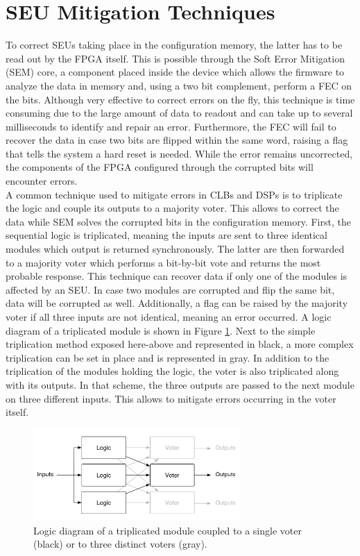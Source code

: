   \section{SEU Mitigation Techniques}

    To correct SEUs taking place in the configuration memory, the latter has to be read out by the FPGA itself. This is possible through the Soft Error Mitigation (SEM) core, a component placed inside the device which allows the firmware to analyze the data in memory and, using a two bit complement, perform a FEC on the bits. Although very effective to correct errors on the fly, this technique is time consuming due to the large amount of data to readout and can take up to several milliseconds to identify and repair an error. Furthermore, the FEC will fail to recover the data in case two bits are flipped within the same word, raising a flag that tells the system a hard reset is needed. While the error remains uncorrected, the components of the FPGA configured through the corrupted bits will encounter errors. \\

    A common technique used to mitigate errors in CLBs and DSPs is to triplicate the logic and couple its outputs to a majority voter. This allows to correct the data while SEM solves the corrupted bits in the configuration memory. First, the sequential logic is triplicated, meaning the inputs are sent to three identical modules which output is returned synchronously. The latter are then forwarded to a majority voter which performs a bit-by-bit vote and returns the most probable response. This technique can recover data if only one of the modules is affected by an SEU. In case two modules are corrupted and flip the same bit, data will be corrupted as well. Additionally, a flag can be raised by the majority voter if all three inputs are not identical, meaning an error occurred. A logic diagram of a triplicated module is shown in Figure \ref{fig:II-5-tmr}. Next to the simple triplication method exposed here-above and represented in black, a more complex triplication can be set in place and is represented in gray. In addition to the triplication of the modules holding the logic, the voter is also triplicated along with its outputs. In that scheme, the three outputs are passed to the next module on three different inputs. This allows to mitigate errors occurring in the voter itself. \\

    \begin{figure}[h!]
      \centering
      \includegraphics[width=0.7\textwidth]{img/II-5-irradiation/tmr}
      \caption{Logic diagram of a triplicated module coupled to a single voter (black) or to three distinct voters (gray).}
      \label{fig:II-5-tmr}
    \end{figure}

